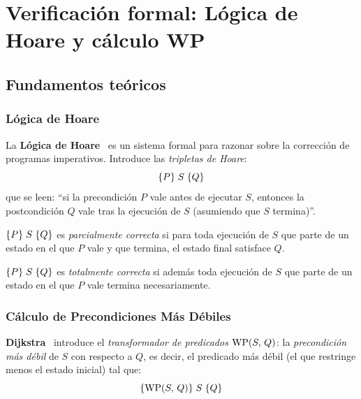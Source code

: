 \chapter{Verificación formal: Lógica de Hoare y cálculo WP}
\label{chap:verificacion}

\section{Fundamentos teóricos}

\subsection{Lógica de Hoare}

La \textbf{Lógica de Hoare}~\cite{hoare1969} es un sistema formal para
razonar sobre la corrección de programas imperativos. Introduce las
\emph{tripletas de Hoare}:
\[
  \{P\}\;S\;\{Q\}
\]
que se leen: ``si la precondición $P$ vale antes de ejecutar $S$,
entonces la postcondición $Q$ vale tras la ejecución de $S$
(asumiendo que $S$ termina)''.

\begin{definicion}
  $\{P\}\;S\;\{Q\}$ es \emph{parcialmente correcta} si para toda
  ejecución de $S$ que parte de un estado en el que $P$ vale y
  que termina, el estado final satisface $Q$.
\end{definicion}

\begin{definicion}
  $\{P\}\;S\;\{Q\}$ es \emph{totalmente correcta} si además
  toda ejecución de $S$ que parte de un estado en el que $P$ vale
  termina necesariamente.
\end{definicion}

\subsection{Cálculo de Precondiciones Más Débiles}

\textbf{Dijkstra}~\cite{dijkstra1976} introduce el \emph{transformador
de predicados} $\mathrm{WP}(S,\,Q)$: la \emph{precondición más débil} de $S$
con respecto a $Q$, es decir, el predicado más débil (el que restringe
menos el estado inicial) tal que:
\[
  \{\mathrm{WP}(S,\,Q)\}\;S\;\{Q\}
\]

